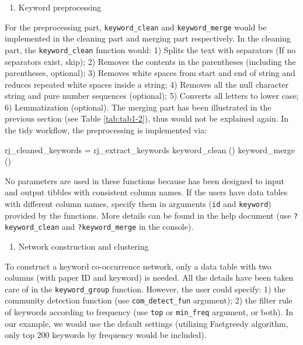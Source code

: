 \begin{enumerate}
\def\labelenumi{(\arabic{enumi})}
\setcounter{enumi}{1}
\tightlist
\item
  Keyword preprocessing
\end{enumerate}

For the preprocessing part, \texttt{keyword\_clean} and
\texttt{keyword\_merge} would be implemented in the cleaning part and
merging part respectively. In the cleaning part, the
\texttt{keyword\_clean} function would: 1) Splits the text with
separators (If no separators exist, skip); 2) Removes the contents in
the parentheses (including the parentheses, optional); 3) Removes white
spaces from start and end of string and reduces repeated white spaces
inside a string; 4) Removes all the null character string and pure
number sequences (optional); 5) Converts all letters to lower case; 6)
Lemmatization (optional). The merging part has been illustrated in the
previous section (see Table \ref{tab:tab1-2}), thus would not be
explained again. In the tidy workflow, the preprocessing is implemented
via:

\begin{Schunk}
\begin{Sinput}
rj_cleaned_keywords = rj_extract_keywords %>%
  keyword_clean () %>%
  keyword_merge ()
\end{Sinput}
\end{Schunk}

No parameters are used in these functions because  has been
designed to input and output tibbles with consistent column names. If
the users have data tables with different column names, specify them in
arguments (\texttt{id} and \texttt{keyword}) provided by the functions.
More details can be found in the help document (use
\texttt{?keyword\_clean} and \texttt{?keyword\_merge} in the console).

\begin{enumerate}
\def\labelenumi{(\arabic{enumi})}
\setcounter{enumi}{2}
\tightlist
\item
  Network construction and clustering
\end{enumerate}

To construct a keyword co-occurrence network, only a data table with two
columns (with paper ID and keyword) is needed. All the details have been
taken care of in the \texttt{keyword\_group} function. However, the user
could specify: 1) the community detection function (use
\texttt{com\_detect\_fun} argument); 2) the filter rule of keywords
according to frequency (use \texttt{top} or \texttt{min\_freq} argument,
or both). In our example, we would use the default settings (utilizing
Fastgreedy algorithm, only top 200 keywords by frequency would be
included).

